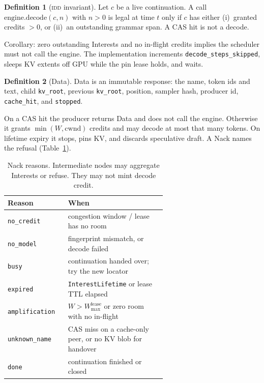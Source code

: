 \documentclass{article}
\theoremstyle{definition}
\newtheorem{definition}{Definition}
\newcommand{\idd}{\textsc{idd}}
\newcommand{\kvroot}{\texttt{kv\_root}}
\newcommand{\cwnd}{\mathrm{cwnd}}
\begin{document}
\begin{definition}[\idd{} invariant]
\label{def:idd}
Let $c$ be a live continuation.
A call $\mathrm{engine.decode}(c, n)$ with $n > 0$ is legal at time $t$ only if $c$ has either (i)~granted credits $> 0$, or (ii)~an outstanding grammar span.
A CAS hit is not a decode.
\end{definition}

Corollary: zero outstanding Interests and no in-flight credits implies the scheduler must not call the engine.
The implementation increments \texttt{decode\_steps\_skipped}, sleeps KV extents off GPU while the pin lease holds, and waits.

\begin{definition}[Data]
Data is an immutable response: the name, token ids and text, child \kvroot{}, previous \kvroot{}, position, sampler hash, producer id, \texttt{cache\_hit}, and \texttt{stopped}.
\end{definition}

On a CAS hit the producer returns Data and does not call the engine.
Otherwise it grants $\min(W, \cwnd)$ credits and may decode at most that many tokens.
On lifetime expiry it stops, pins KV, and discards speculative draft.
A Nack names the refusal (Table~\ref{tab:nack}).

\begin{table}[t]
\centering
\small
\caption{Nack reasons. Intermediate nodes may aggregate Interests or refuse. They may not mint decode credit.}
\label{tab:nack}
\begin{tabular}{lp{0.62\linewidth}}
\toprule
Reason & When \\
\midrule
\texttt{no\_credit} & congestion window / lease has no room \\
\texttt{no\_model} & fingerprint mismatch, or decode failed \\
\texttt{busy} & continuation handed over; try the new locator \\
\texttt{expired} & \texttt{InterestLifetime} or lease TTL elapsed \\
\texttt{amplification} & $W > W_{\max}^{\mathrm{lease}}$ or zero room with no in-flight \\
\texttt{unknown\_name} & CAS miss on a cache-only peer, or no KV blob for handover \\
\texttt{done} & continuation finished or closed \\
\bottomrule
\end{tabular}
\end{table}
\end{document}
